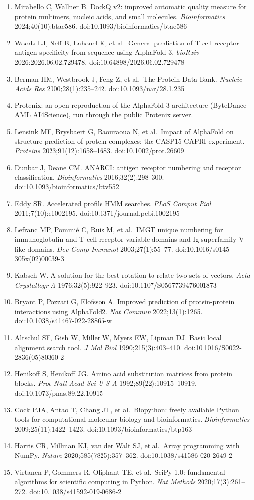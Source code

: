 \documentclass[
  11pt,
]{article}
\begin{document}
\begin{enumerate}
\item
  Mirabello C, Wallner B. DockQ v2: improved automatic quality measure for protein multimers, nucleic acids, and small molecules. \emph{Bioinformatics} 2024;40(10):btae586. doi:10.1093/bioinformatics/btae586
\item
  Woods LJ, Neff B, Lahouel K, et al.~General prediction of T cell receptor antigen specificity from sequence using AlphaFold 3. \emph{bioRxiv} 2026:2026.06.02.729478. doi:10.64898/2026.06.02.729478
\item
  Berman HM, Westbrook J, Feng Z, et al.~The Protein Data Bank. \emph{Nucleic Acids Res} 2000;28(1):235--242. doi:10.1093/nar/28.1.235
\item
  Protenix: an open reproduction of the AlphaFold 3 architecture (ByteDance AML AI4Science), run through the public Protenix server.
\item
  Lensink MF, Brysbaert G, Raouraoua N, et al.~Impact of AlphaFold on structure prediction of protein complexes: the CASP15-CAPRI experiment. \emph{Proteins} 2023;91(12):1658--1683. doi:10.1002/prot.26609
\item
  Dunbar J, Deane CM. ANARCI: antigen receptor numbering and receptor classification. \emph{Bioinformatics} 2016;32(2):298--300. doi:10.1093/bioinformatics/btv552
\item
  Eddy SR. Accelerated profile HMM searches. \emph{PLoS Comput Biol} 2011;7(10):e1002195. doi:10.1371/journal.pcbi.1002195
\item
  Lefranc MP, Pommié C, Ruiz M, et al.~IMGT unique numbering for immunoglobulin and T cell receptor variable domains and Ig superfamily V-like domains. \emph{Dev Comp Immunol} 2003;27(1):55--77. doi:10.1016/s0145-305x(02)00039-3
\item
  Kabsch W. A solution for the best rotation to relate two sets of vectors. \emph{Acta Crystallogr A} 1976;32(5):922--923. doi:10.1107/S0567739476001873
\item
  Bryant P, Pozzati G, Elofsson A. Improved prediction of protein-protein interactions using AlphaFold2. \emph{Nat Commun} 2022;13(1):1265. doi:10.1038/s41467-022-28865-w
\item
  Altschul SF, Gish W, Miller W, Myers EW, Lipman DJ. Basic local alignment search tool. \emph{J Mol Biol} 1990;215(3):403--410. doi:10.1016/S0022-2836(05)80360-2
\item
  Henikoff S, Henikoff JG. Amino acid substitution matrices from protein blocks. \emph{Proc Natl Acad Sci U S A} 1992;89(22):10915--10919. doi:10.1073/pnas.89.22.10915
\item
  Cock PJA, Antao T, Chang JT, et al.~Biopython: freely available Python tools for computational molecular biology and bioinformatics. \emph{Bioinformatics} 2009;25(11):1422--1423. doi:10.1093/bioinformatics/btp163
\item
  Harris CR, Millman KJ, van der Walt SJ, et al.~Array programming with NumPy. \emph{Nature} 2020;585(7825):357--362. doi:10.1038/s41586-020-2649-2
\item
  Virtanen P, Gommers R, Oliphant TE, et al.~SciPy 1.0: fundamental algorithms for scientific computing in Python. \emph{Nat Methods} 2020;17(3):261--272. doi:10.1038/s41592-019-0686-2
\end{enumerate}
\end{document}
